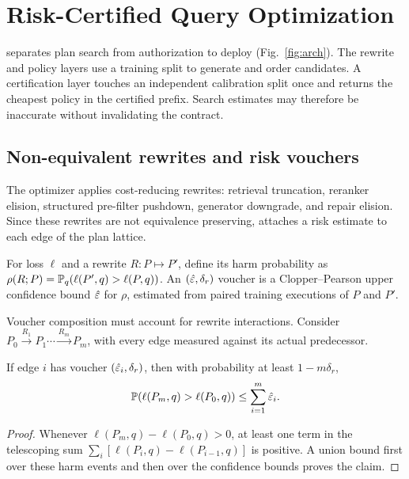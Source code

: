 \section{Risk-Certified Query Optimization}
\label{sec:optimizer}



\system separates plan search from authorization to deploy
(Fig.~\ref{fig:arch}). The rewrite and policy layers use a training split
to generate and order candidates. A certification layer touches an
independent calibration split once and returns the cheapest policy in the
certified prefix. Search estimates may therefore be inaccurate without
invalidating the contract.

\subsection{Non-equivalent rewrites and risk vouchers}
\label{sec:rewrites}



The optimizer applies cost-reducing rewrites: retrieval truncation,
reranker elision, structured pre-filter pushdown, generator downgrade, and
repair elision. Since these rewrites are not equivalence preserving,
\system attaches a risk estimate to each edge of the plan lattice.

\begin{definition}
\label{def:voucher}
For loss $\ell$ and a rewrite $R:P\mapsto P'$, define its harm probability
as $\rho(R;P)=\mathbb{P}_q(\ell(P',q)>\ell(P,q))$. An
$(\hat{\varepsilon},\delta_r)$ voucher is a Clopper--Pearson upper confidence bound
$\hat{\varepsilon}$ for $\rho$, estimated from paired training executions of $P$
and $P'$.
\end{definition}

Voucher composition must account for rewrite interactions. Consider
$P_0\xrightarrow{R_1}P_1\cdots\xrightarrow{R_m}P_m$, with every edge
measured against its actual predecessor.

\begin{proposition}
\label{prop:composition}
If edge $i$ has voucher $(\hat{\varepsilon}_i,\delta_r)$, then with probability at
least $1-m\delta_r$,
\[
\mathbb{P}(\ell(P_m,q)>\ell(P_0,q))\leq\sum_{i=1}^{m}\hat{\varepsilon}_i .
\]
\end{proposition}
\begin{proof}
Whenever $\ell(P_m,q)-\ell(P_0,q)>0$, at least one term in the telescoping
sum $\sum_i[\ell(P_i,q)-\ell(P_{i-1},q)]$ is positive. A union bound first
over these harm events and then over the confidence bounds proves the
claim.
\end{proof}

